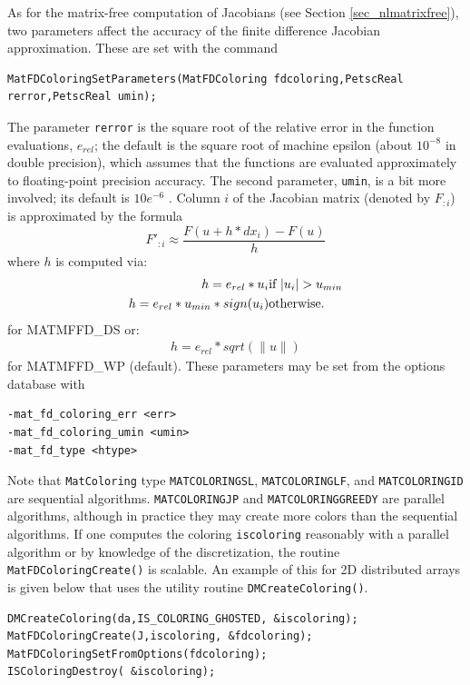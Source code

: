 As for the matrix-free computation of Jacobians (see Section
\ref{sec_nlmatrixfree}), two parameters affect the accuracy of the
finite difference Jacobian approximation.  These are set with the command
\begin{lstlisting}
MatFDColoringSetParameters(MatFDColoring fdcoloring,PetscReal rerror,PetscReal umin);
\end{lstlisting}
The parameter \lstinline{rerror} is the square root of
the relative error in the function evaluations, $e_{rel}$; the default is the square root of machine epsilon (about $10^{-8}$ in double precision), which assumes
that the functions are evaluated approximately to floating-point precision accuracy. The
second parameter, \lstinline{umin}, is a bit more involved; its default is
$ 10e^{-6} $ .  Column $i$ of the Jacobian matrix (denoted by $F_{:i}$) is
approximated by the formula
\[
    F'_{:i} \approx \frac{F(u + h*dx_{i}) - F(u)}{h}
\]
where $ h $ is computed via:
\begin{eqnarray*}
        h = e_{rel}*u_{i}             &    \hbox{if }  |u_{i}| > u_{min} \\
        h = e_{rel}*u_{min}*sign(u_{i})  &    \hbox{otherwise}.
\end{eqnarray*}
for MATMFFD\_DS
or:
\begin{eqnarray*}
        h = e_{rel}*sqrt(\|u\|)
\end{eqnarray*}
for MATMFFD\_WP (default).
These parameters may be set from the options database with
\begin{lstlisting}
-mat_fd_coloring_err <err>
-mat_fd_coloring_umin <umin>
-mat_fd_type <htype>
\end{lstlisting}
  

Note that \lstinline{MatColoring} type \lstinline{MATCOLORINGSL}, \lstinline{MATCOLORINGLF}, and \lstinline{MATCOLORINGID} are sequential algorithms.  \lstinline{MATCOLORINGJP} and
\lstinline{MATCOLORINGGREEDY} are parallel algorithms, although in practice they may create more colors than the sequential
algorithms.  If one computes the coloring \lstinline{iscoloring} reasonably with a parallel algorithm or by knowledge of the
discretization, the routine \lstinline{MatFDColoringCreate()} is scalable.  An example of this for 2D distributed arrays is given
below that uses the utility routine \lstinline{DMCreateColoring()}.

\begin{lstlisting}
DMCreateColoring(da,IS_COLORING_GHOSTED, &iscoloring);
MatFDColoringCreate(J,iscoloring, &fdcoloring);
MatFDColoringSetFromOptions(fdcoloring);
ISColoringDestroy( &iscoloring);
\end{lstlisting}

